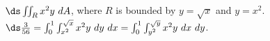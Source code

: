 {$\ds \iint_R x^2y\ dA$, where $R$ is bounded by $y=\sqrt{x}$ and $y=x^2$.
}
{$\ds \frac3{56} = \int_0^1\int_{x^2}^{\sqrt{x}}x^2y\ dy\ dx = \int_0^1\int_{y^2}^{\sqrt{y}}x^2y\ dx\ dy$.
}
